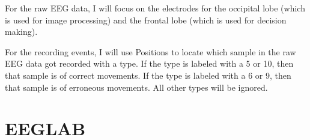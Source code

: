 \documentclass[12pt]{article}
\begin{document}
For the raw EEG data, I will focus on the electrodes for the occipital lobe (which is used for image processing) and the frontal lobe (which is used for decision making).

For the recording events, I will use Positions to locate which sample in the raw EEG data got recorded with a type. If the type is labeled with a 5 or 10, then that sample is of correct movements. If the type is labeled with a 6 or 9, then that sample is of erroneous movements. All other types will be ignored.

\section{EEGLAB}
\end{document}
